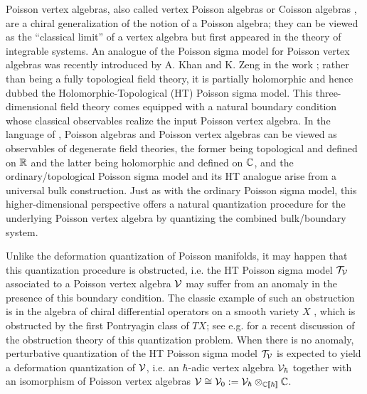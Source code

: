 \documentclass[11pt]{amsart}
\numberwithin{equation}{section}
\numberwithin{figure}{section}
\numberwithin{table}{section}
\begin{document}
Poisson vertex algebras, also called vertex Poisson algebras \cite{DLM, FBZ} or Coisson algebras \cite{Beilinson:2004chiral}, are a chiral generalization of the notion of a Poisson algebra; they can be viewed as the \enquote{classical limit} of a vertex algebra but first appeared in the theory of integrable systems.
An analogue of the Poisson sigma model for Poisson vertex algebras was recently introduced by A. Khan and K. Zeng in the work \cite{Khan:2025rah}; rather than being a fully topological field theory, it is partially holomorphic and hence dubbed the Holomorphic-Topological (HT) Poisson sigma model.
This three-dimensional field theory comes equipped with a natural boundary condition whose classical observables realize the input Poisson vertex algebra.
In the language of \cite{Butson:2016jys}, Poisson algebras and Poisson vertex algebras can be viewed as observables of degenerate field theories, the former being topological and defined on ${\mathbb R}$ and the latter being holomorphic and defined on ${\mathbb C}$, and the ordinary/topological Poisson sigma model and its HT analogue arise from a universal bulk construction.
Just as with the ordinary Poisson sigma model, this higher-dimensional perspective offers a natural quantization procedure for the underlying Poisson vertex algebra by quantizing the combined bulk/boundary system.

Unlike the deformation quantization of Poisson manifolds, it may happen that this quantization procedure is obstructed, i.e. the HT Poisson sigma model ${\mathcal T}_{\mathcal V}$ associated to a Poisson vertex algebra ${\mathcal V}$ may suffer from an anomaly in the presence of this boundary condition.
The classic example of such an obstruction is in the algebra of chiral differential operators on a smooth variety $X$ \cite{GMS00, GMS03, Beilinson:2004chiral}, which is obstructed by the first Pontryagin class of $TX$; see e.g. \cite{Butson:2026vmn} for a recent discussion of the obstruction theory of this quantization problem.
When there is no anomaly, perturbative quantization of the HT Poisson sigma model ${\mathcal T}_{\mathcal V}$ is expected to yield a deformation quantization of ${\mathcal V}$, i.e. an $\hbar$-adic vertex algebra ${\mathcal V}_\hbar$ together with an isomorphism of Poisson vertex algebras ${\mathcal V} \cong {\mathcal V}_0 := {\mathcal V}_\hbar \otimes_{{\mathbb C}[\![\hbar]\!]} {\mathbb C}$.
\end{document}
